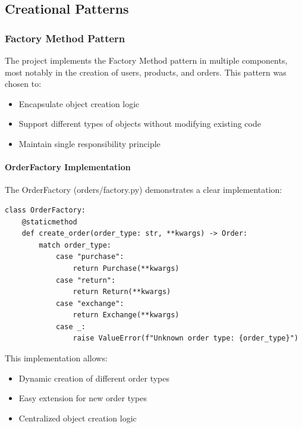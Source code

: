 \documentclass[12pt,a4paper]{article}
\begin{document}
\subsection{Creational Patterns}

\subsubsection{Factory Method Pattern}
The project implements the Factory Method pattern in multiple components, most notably in the creation of users, products, and orders. This pattern was chosen to:

\begin{itemize}
    \item Encapsulate object creation logic
    \item Support different types of objects without modifying existing code
    \item Maintain single responsibility principle
\end{itemize}

\paragraph{OrderFactory Implementation}
The OrderFactory (orders/factory.py) demonstrates a clear implementation:
\begin{verbatim}
class OrderFactory:
    @staticmethod
    def create_order(order_type: str, **kwargs) -> Order:
        match order_type:
            case "purchase":
                return Purchase(**kwargs)
            case "return": 
                return Return(**kwargs)
            case "exchange":
                return Exchange(**kwargs)
            case _:
                raise ValueError(f"Unknown order type: {order_type}")
\end{verbatim}

This implementation allows:
\begin{itemize}
    \item Dynamic creation of different order types
    \item Easy extension for new order types
    \item Centralized object creation logic
\end{itemize}
\end{document}
